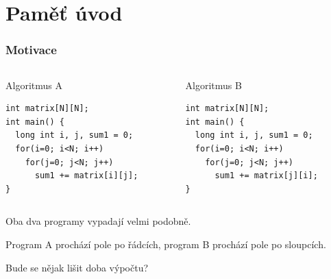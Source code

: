 \documentclass{beamer}
\subtitle{Lekce 04. Hierarchie paměti}
\author{Pavel Píša \phantom{xxxxxxx} Petr Štěpán \\ \small\texttt{pisa@fel.cvut.cz}\phantom{xxxx}\small\texttt{stepan@fel.cvut.cz}}
\begin{document}
\maketitle

\section{Paměť úvod}

\begin{frame}[fragile]
\frametitle{Motivace}

\begin{columns}
\begin{column}{0.45\textwidth}
Algoritmus A\\
\begin{verbatim}
int matrix[N][N];
int main() {
  long int i, j, sum1 = 0;
  for(i=0; i<N; i++)
    for(j=0; j<N; j++)
      sum1 += matrix[i][j];
}
\end{verbatim}
\end{column}
\hfill
\begin{column}{0.45\textwidth}
Algoritmus B\\
\begin{verbatim}
int matrix[N][N];
int main() {
  long int i, j, sum1 = 0;
  for(i=0; i<N; i++)
    for(j=0; j<N; j++)
      sum1 += matrix[j][i];
}
\end{verbatim}
\end{column}
\end{columns}
\bigskip
Oba dva programy vypadají velmi podobně. 

Program A prochází pole po řádcích, program B prochází pole po sloupcích.
\bigskip

Bude se nějak lišit doba výpočtu?

\end{frame}
\end{document}
